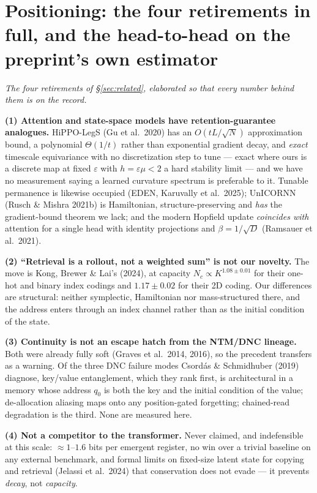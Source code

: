 \documentclass{article}
\begin{document}
\section{Positioning: the four retirements in full, and the head-to-head on the preprint's own estimator}\label{app:pos}

\emph{The four retirements of \S\ref{sec:related}, elaborated so that every number behind them is on the record.}

\textbf{(1) Attention and state-space models have retention-guarantee analogues.} HiPPO-LegS (Gu et al.\ 2020) has an $O(tL/\sqrt N)$ approximation bound, a polynomial $\Theta(1/t)$ rather than exponential gradient decay, and \emph{exact} timescale equivariance with no discretization step to tune --- exact where ours is a discrete map at fixed $\varepsilon$ with $h=\varepsilon\mu<2$ a hard stability limit --- and we have no measurement saying a learned curvature spectrum is preferable to it. Tunable permanence is likewise occupied (EDEN, Karuvally et al.\ 2025); UnICORNN (Rusch \& Mishra 2021b) is Hamiltonian, structure-preserving and \emph{has} the gradient-bound theorem we lack; and the modern Hopfield update \emph{coincides with} attention for a single head with identity projections and $\beta=1/\sqrt D$ (Ramsauer et al.\ 2021).

\textbf{(2) ``Retrieval is a rollout, not a weighted sum'' is not our novelty.} The move is Kong, Brewer \& Lai's (2024), at capacity $N_c\propto K^{1.08\pm0.01}$ for their one-hot and binary index codings and $1.17\pm0.02$ for their 2D coding. Our differences are structural: neither symplectic, Hamiltonian nor mass-structured there, and the address enters through an index channel rather than as the initial condition of the state.

\textbf{(3) Continuity is not an escape hatch from the NTM/DNC lineage.} Both were already fully soft (Graves et al.\ 2014, 2016), so the precedent transfers as a warning. Of the three DNC failure modes Csord\'as \& Schmidhuber (2019) diagnose, key/value entanglement, which they rank first, is architectural in a memory whose address $q_0$ is both the key and the initial condition of the value; de-allocation aliasing maps onto any position-gated forgetting; chained-read degradation is the third. None are measured here.

\textbf{(4) Not a competitor to the transformer.} Never claimed, and indefensible at this scale: $\approx1$--$1.6$ bits per emergent register, no win over a trivial baseline on any external benchmark, and formal limits on fixed-size latent state for copying and retrieval (Jelassi et al.\ 2024) that conservation does not evade --- it prevents \emph{decay}, not \emph{capacity}.
\end{document}

